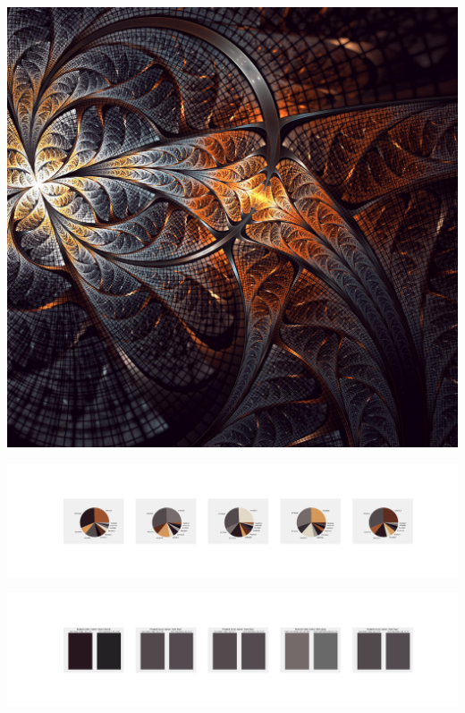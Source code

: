 \documentclass[11pt]{article}
\begin{document}
\begin{landscape}
    \begin{center}
    \includegraphics[width=\textwidth]{./nbimg/file (268).jpg}
    \end{center}

    \begin{center}
    \includegraphics[width=250mm]{./nbimg/pie-187.jpg}
    \end{center}

    \begin{center}
    \includegraphics[width=250mm]{./nbimg/peak-187.jpg}
    \end{center}
    


\end{landscape}
\end{document}

